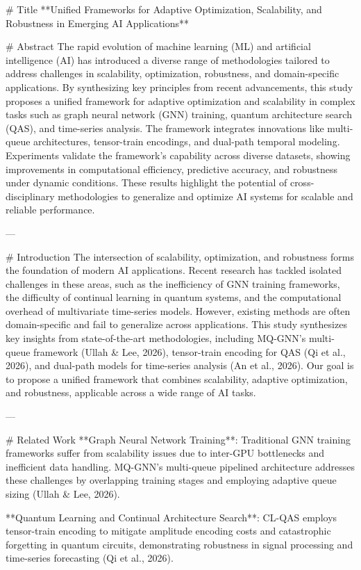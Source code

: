 # Title  
**Unified Frameworks for Adaptive Optimization, Scalability, and Robustness in Emerging AI Applications**

# Abstract  
The rapid evolution of machine learning (ML) and artificial intelligence (AI) has introduced a diverse range of methodologies tailored to address challenges in scalability, optimization, robustness, and domain-specific applications. By synthesizing key principles from recent advancements, this study proposes a unified framework for adaptive optimization and scalability in complex tasks such as graph neural network (GNN) training, quantum architecture search (QAS), and time-series analysis. The framework integrates innovations like multi-queue architectures, tensor-train encodings, and dual-path temporal modeling. Experiments validate the framework’s capability across diverse datasets, showing improvements in computational efficiency, predictive accuracy, and robustness under dynamic conditions. These results highlight the potential of cross-disciplinary methodologies to generalize and optimize AI systems for scalable and reliable performance.

---

# Introduction  
The intersection of scalability, optimization, and robustness forms the foundation of modern AI applications. Recent research has tackled isolated challenges in these areas, such as the inefficiency of GNN training frameworks, the difficulty of continual learning in quantum systems, and the computational overhead of multivariate time-series models. However, existing methods are often domain-specific and fail to generalize across applications. This study synthesizes key insights from state-of-the-art methodologies, including MQ-GNN's multi-queue framework (Ullah & Lee, 2026), tensor-train encoding for QAS (Qi et al., 2026), and dual-path models for time-series analysis (An et al., 2026). Our goal is to propose a unified framework that combines scalability, adaptive optimization, and robustness, applicable across a wide range of AI tasks.

---

# Related Work  
**Graph Neural Network Training**: Traditional GNN training frameworks suffer from scalability issues due to inter-GPU bottlenecks and inefficient data handling. MQ-GNN's multi-queue pipelined architecture addresses these challenges by overlapping training stages and employing adaptive queue sizing (Ullah & Lee, 2026).  

**Quantum Learning and Continual Architecture Search**: CL-QAS employs tensor-train encoding to mitigate amplitude encoding costs and catastrophic forgetting in quantum circuits, demonstrating robustness in signal processing and time-series forecasting (Qi et al., 2026).  

